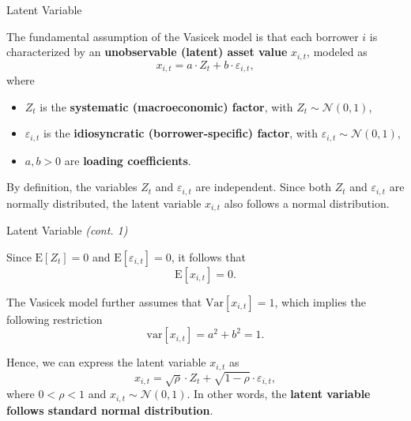 \documentclass{beamer}
\begin{document}
\begin{frame}{Latent Variable}
\justifying
\small

The fundamental assumption of the Vasicek model is that each borrower $i$ is characterized by an \textbf{unobservable (latent) asset value} $x_{i,t}$, modeled as
\begin{equation}
x_{i,t} = a \cdot Z_t + b \cdot \varepsilon_{i,t},
\end{equation}
where
\begin{itemize}
    \item $Z_t$ is the \textbf{systematic (macroeconomic) factor}, with $Z_t \sim \mathcal{N}(0,1)$,
    \item $\varepsilon_{i,t}$ is the \textbf{idiosyncratic (borrower-specific) factor}, with $\varepsilon_{i,t} \sim \mathcal{N}(0,1)$,
    \item $a, b > 0$ are \textbf{loading coefficients}.
\end{itemize}

\medskip

By definition, the variables $Z_t$ and $\varepsilon_{i,t}$ are independent. Since both $Z_t$ and $\varepsilon_{i,t}$ are normally distributed, the latent variable $x_{i,t}$ also follows a normal distribution.

\end{frame}

\begin{frame}{Latent Variable \textit{(cont. 1)}}
\justifying
\small

Since $\mathrm{E}[Z_t] = 0$ and $\mathrm{E}[\varepsilon_{i,t}] = 0$, it follows that
\begin{equation*}
\mathrm{E}[x_{i,t}] = 0.
\end{equation*}

The Vasicek model further assumes that $\mathrm{Var}[x_{i,t}] = 1$, which implies the following restriction
\begin{equation*}
\mathrm{var}[x_{i,t}] = a^2 + b^2 = 1.
\end{equation*}

\medskip

Hence, we can express the latent variable $x_{i,t}$ as
\begin{equation}
x_{i,t} = \sqrt{\rho} \cdot Z_t + \sqrt{1 - \rho} \cdot \varepsilon_{i,t},
\end{equation}
where $0 < \rho < 1$ and $x_{i,t} \sim \mathcal{N}(0,1)$. In other words, the \textbf{latent variable follows standard normal distribution}.

\end{frame}
\end{document}
